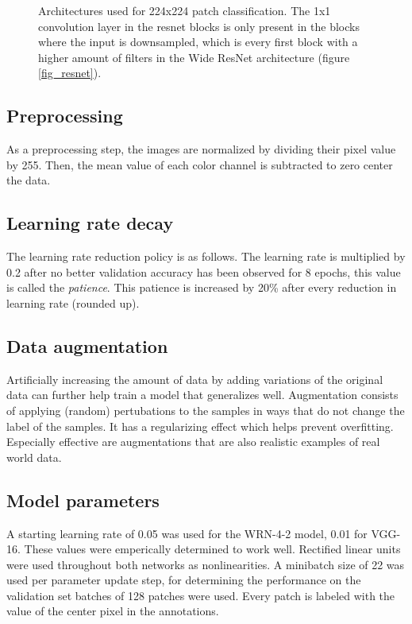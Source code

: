 \documentclass[journal]{IEEEtran}
\begin{document}
\begin{figure}[!t]
{\label{fig_vgg}}
\vspace{-0.12cm}
\caption{Architectures used for 224x224 patch classification. The 1x1 convolution layer in the resnet blocks is only present in the blocks where the input is downsampled, which is every first block with a higher amount of filters in the Wide ResNet architecture (figure \ref{fig_resnet}).}
\label{fig_architectures}
\end{figure}

\subsection{Preprocessing}
As a preprocessing step, the images are normalized by dividing their pixel value by 255. Then, the mean value of each color channel is subtracted to zero center the data.

\subsection{Learning rate decay}
The learning rate reduction policy is as follows. The learning rate is multiplied by 0.2 after no better validation accuracy has been observed for 8 epochs, this value is called the \emph{patience}. This patience is increased by 20\% after every reduction in learning rate (rounded up).  

\subsection{Data augmentation}
Artificially increasing the amount of data by adding variations of the original data can further help train a model that generalizes well. Augmentation consists of applying (random) pertubations to the samples in ways that do not change the label of the samples. It has a regularizing effect which helps prevent overfitting. Especially effective are augmentations that are also realistic examples of real world data.

\subsection{Model parameters}
A starting learning rate of 0.05 was used for the WRN-4-2 model, 0.01 for VGG-16. These values were emperically determined to work well. Rectified linear units were used throughout both networks as nonlinearities. A minibatch size of 22 was used per parameter update step, for determining the performance on the validation set batches of 128 patches were used. Every patch is labeled with the value of the center pixel in the annotations. 
\end{document}
